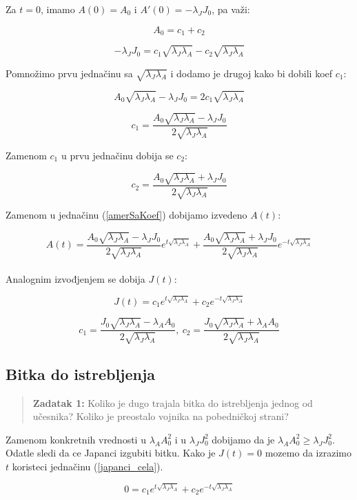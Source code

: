 \documentclass{article}
\newcommand{\laj}{\sqrt{\lambda_J\lambda_A}}
\begin{document}
Za \(t = 0\), imamo  \(A(0) = A_0\) i
\(A'(0) = -\lambda_{J}J_0\), pa važi:

\[
  A_0 = c_1 + c_2
\]

\[
  -\lambda_{J}J_0 = c_1 \laj - c_2 \laj
\]

Pomnožimo prvu jednačinu sa \( \laj \) i dodamo je
drugoj kako bi dobili koef \( c_1 \):

\[
  A_0 \laj - \lambda_{J}J_0 = 2 c_1 \laj
\]

\[
  c_1 = \frac{A_0 \laj - \lambda_J J_0}{2\laj }
\]

Zamenom \(c_1\) u prvu jednačinu dobija se \(c_2\):

\[
  c_2 = \frac{A_0 \laj + \lambda_J J_0}{2\laj }
\]

Zamenom u jednačinu (\ref{amerSaKoef}) dobijamo izvedeno \(A(t)\):

\begin{equation}\label{ameri_cela}
  A(t) = \frac{A_0 \laj - \lambda_J J_0}{2 \laj } e^{t \laj } + \frac{A_0 \laj +
\lambda_J J_0}{2 \laj } e^{-t \laj}
\end{equation}
\\
Analognim izvođjenjem se dobija \(J(t)\):

\begin{equation}\label{japanci_cela}
  J(t) = c_1 e^{t \laj} + c_2 e^{-t \laj}
\end{equation}

\[
 c_1 = \frac{J_0 \laj- \lambda_A A_0}{2\laj},\ 
 c_2 = \frac{J_0 \laj+ \lambda_A A_0}{2 \laj}
\]


\newpage

\subsection{Bitka do istrebljenja}

\vspace{5mm}
\begin{quote}
\textbf{Zadatak 1:}
Koliko je dugo trajala bitka do istrebljenja jednog od
učesnika? Koliko je preostalo vojnika na pobedničkoj
strani?
\end{quote}


\hspace{5mm}
Zamenom konkretnih vrednosti u \(\lambda_{A}A_0^2\) i u \(\lambda_{J}J_0^2\)
dobijamo da je \(\lambda_{A}A_0^2 \geq \lambda_{J}J_0^2\). Odatle sledi da ce
Japanci izgubiti bitku.
Kako je \(J(t) = 0\) mozemo da izrazimo \(t\) koristeci jednačinu
(\ref{japanci_cela}).

\[
  0 = c_1 e^{t \laj} + c_2 e^{-t \laj}
\]
\end{document}
